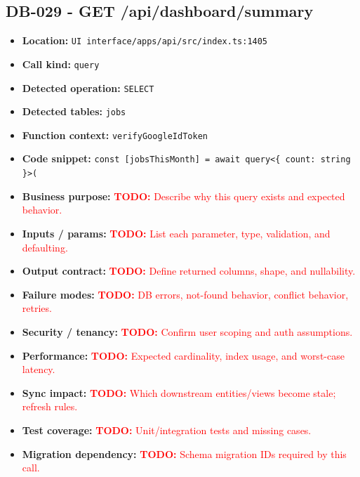 \documentclass[11pt]{article}
\newcommand{\todoitem}[1]{\textcolor{red}{\textbf{TODO:} #1}}
\begin{document}
\subsection{DB-029 - GET /api/dashboard/summary}
\begin{itemize}[leftmargin=1.5em]
\item \textbf{Location:} \texttt{UI interface/apps/api/src/index.ts:1405}
\item \textbf{Call kind:} \texttt{query}
\item \textbf{Detected operation:} \texttt{SELECT}
\item \textbf{Detected tables:} \texttt{jobs}
\item \textbf{Function context:} \texttt{verifyGoogleIdToken}
\item \textbf{Code snippet:} \texttt{const [jobsThisMonth] = await query<\{ count: string \}>(}
\item \textbf{Business purpose:} \todoitem{Describe why this query exists and expected behavior.}
\item \textbf{Inputs / params:} \todoitem{List each parameter, type, validation, and defaulting.}
\item \textbf{Output contract:} \todoitem{Define returned columns, shape, and nullability.}
\item \textbf{Failure modes:} \todoitem{DB errors, not-found behavior, conflict behavior, retries.}
\item \textbf{Security / tenancy:} \todoitem{Confirm user scoping and auth assumptions.}
\item \textbf{Performance:} \todoitem{Expected cardinality, index usage, and worst-case latency.}
\item \textbf{Sync impact:} \todoitem{Which downstream entities/views become stale; refresh rules.}
\item \textbf{Test coverage:} \todoitem{Unit/integration tests and missing cases.}
\item \textbf{Migration dependency:} \todoitem{Schema migration IDs required by this call.}
\end{itemize}
\end{document}

